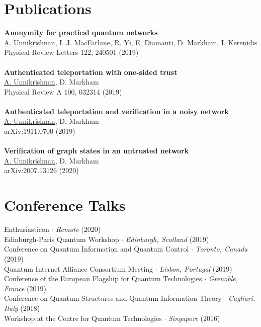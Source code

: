 \documentclass[12pt,a4paper]{article}
\newcommand{\middot}{\boldsymbol{\cdot}}
\begin{document}
\section*{Publications \sout{\hfill}}

\vspace{2mm}

\textbf{Anonymity for practical quantum networks} \\
\underline{A. Unnikrishnan}, I. J. MacFarlane, R. Yi, E. Diamanti, D. Markham, I. Kerenidis \\
Physical Review Letters 122, 240501 (2019) \\ \\
\textbf{Authenticated teleportation with one-sided trust} \\
\underline{A. Unnikrishnan}, D. Markham \\ 
Physical Review A 100, 032314 (2019) \\ \\
\textbf{Authenticated teleportation and verification in a noisy network} \\
\underline{A. Unnikrishnan}, D. Markham \\
arXiv:1911.0700 (2019) \\ \\ 
\textbf{Verification of graph states in an untrusted network} \\
\underline{A. Unnikrishnan}, D. Markham \\
arXiv:2007.13126 (2020)

\vspace{2mm}

\section*{Conference Talks \sout{\hfill}}

\vspace{2mm}

Enthusiasticon $\middot$ \textit{Remote} (2020) \\ 
Edinburgh-Paris Quantum Workshop $\middot$ \textit{Edinburgh, Scotland} (2019) \\ 
Conference on Quantum Information and Quantum Control $\middot$ \textit{Toronto, Canada} (2019) \\ 
Quantum Internet Alliance Consortium Meeting $\middot$ \textit{Lisbon, Portugal} (2019) \\ 
Conference of the European Flagship for Quantum Technologies $\middot$ \textit{Grenoble, France} (2019) \\  
Conference on Quantum Structures and Quantum Information Theory $\middot$ \textit{Cagliari, Italy} (2018) \\  
Workshop at the Centre for Quantum Technologies $\middot$ \textit{Singapore} (2016)
\end{document}
